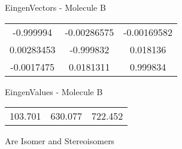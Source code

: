 \begin{multicols}{2}
\begin{center}
\vtab
 EingenVectors - Molecule B     \\
\vtab
\begin{tabular}{|c c c|}
-0.999994	 & 	-0.00286575	 & 	-0.00169582	 \\
0.00283453	 & 	-0.999832	 & 	0.018136	 \\
-0.0017475	 & 	0.0181311	 & 	0.999834
\end{tabular}

\vtab
 EingenValues - Molecule B     \\
\vtab
\begin{tabular}{|c c c|}
103.701	 & 	630.077	 & 	722.452
\end{tabular}

\end{center}
\end{multicols}
\begin{center}
\vtab
\vtab
\textcolor{NavyBlue}{\Large Are Isomer and Stereoisomers}
\end{center}
\newpage

